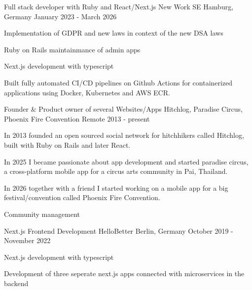 

\begin{cventries}
  \cventry
    {Full stack developer with Ruby and React/Next.js} %
    {New Work SE} %
    {Hamburg, Germany} %
    {January 2023 - March 2026} %
    {
      \begin{cvitems} %
        \item {Implementation of GDPR and new laws in context of the new DSA laws}
        \item {Ruby on Rails maintainmance of admin apps}
        \item {Next.js development with typescript}
        \item {Built fully automated CI/CD pipelines on Github Actions for containerized applications using Docker, Kubernetes and AWS ECR.}
      \end{cvitems}
    }

  \cventry
    {Founder \& Product owner of several Websites/Apps} %
    {Hitchlog, Paradise Circus, Phoenix Fire Convention} %
    {Remote} %
    {2013 - present} %
    {
      \begin{cvitems} %
        \item {In 2013 founded an open sourced social network for hitchhikers called Hitchlog, built with Ruby on Rails and later React.}
        \item {In 2025 I became passionate about app development and started paradise circus, a cross-platform mobile app for a circus arts community in Pai, Thailand.}
        \item {In 2026 together with a friend I started working on a mobile app for a big festival/convention called Phoenix Fire Convention.}
        \item {Community management}
      \end{cvitems}
    }

  \cventry
    {Next.js Frontend Development} %
    {HelloBetter} %
    {Berlin, Germany} %
    {October 2019 - November 2022} %
    {
      \begin{cvitems} %
        \item {Next.js development with typescript}
        \item {Development of three seperate next.js apps connected with microservices in the backend}
      \end{cvitems}
    }


\end{cventries}
